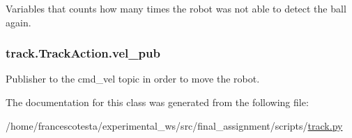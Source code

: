 Variables that counts how many times the robot was not able to detect the ball again. 

\subsubsection[{\texorpdfstring{vel\+\_\+pub}{vel_pub}}]{\setlength{\rightskip}{0pt plus 5cm}track.\+Track\+Action.\+vel\+\_\+pub\hspace{0.3cm}{\ttfamily [static]}}\hypertarget{classtrack_1_1TrackAction_af6105c2cad0d325296213d7c03c4fb6e}{}\label{classtrack_1_1TrackAction_af6105c2cad0d325296213d7c03c4fb6e}


Publisher to the cmd\+\_\+vel topic in order to move the robot. 



The documentation for this class was generated from the following file\+:\begin{DoxyCompactItemize}
\item 
/home/francescotesta/experimental\+\_\+ws/src/final\+\_\+assignment/scripts/\hyperlink{track_8py}{track.\+py}\end{DoxyCompactItemize}
